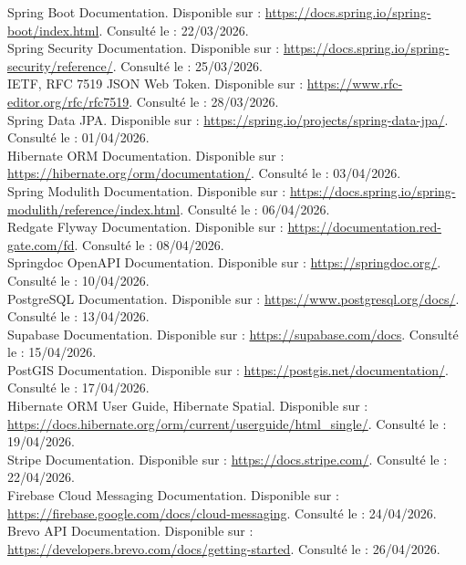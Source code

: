 \noindent [13] Spring Boot Documentation. Disponible sur : \url{https://docs.spring.io/spring-boot/index.html}. Consulté le : 22/03/2026.\\
\noindent [14] Spring Security Documentation. Disponible sur : \url{https://docs.spring.io/spring-security/reference/}. Consulté le : 25/03/2026.\\
\noindent [15] IETF, RFC 7519 JSON Web Token. Disponible sur : \url{https://www.rfc-editor.org/rfc/rfc7519}. Consulté le : 28/03/2026.\\
\noindent [16] Spring Data JPA. Disponible sur : \url{https://spring.io/projects/spring-data-jpa/}. Consulté le : 01/04/2026.\\
\noindent [17] Hibernate ORM Documentation. Disponible sur : \url{https://hibernate.org/orm/documentation/}. Consulté le : 03/04/2026.\\
\noindent [18] Spring Modulith Documentation. Disponible sur : \url{https://docs.spring.io/spring-modulith/reference/index.html}. Consulté le : 06/04/2026.\\
\noindent [19] Redgate Flyway Documentation. Disponible sur : \url{https://documentation.red-gate.com/fd}. Consulté le : 08/04/2026.\\
\noindent [20] Springdoc OpenAPI Documentation. Disponible sur : \url{https://springdoc.org/}. Consulté le : 10/04/2026.\\
\noindent [21] PostgreSQL Documentation. Disponible sur : \url{https://www.postgresql.org/docs/}. Consulté le : 13/04/2026.\\
\noindent [22] Supabase Documentation. Disponible sur : \url{https://supabase.com/docs}. Consulté le : 15/04/2026.\\
\noindent [23] PostGIS Documentation. Disponible sur : \url{https://postgis.net/documentation/}. Consulté le : 17/04/2026.\\
\noindent [24] Hibernate ORM User Guide, Hibernate Spatial. Disponible sur : \url{https://docs.hibernate.org/orm/current/userguide/html_single/}. Consulté le : 19/04/2026.\\
\noindent [25] Stripe Documentation. Disponible sur : \url{https://docs.stripe.com/}. Consulté le : 22/04/2026.\\
\noindent [26] Firebase Cloud Messaging Documentation. Disponible sur : \url{https://firebase.google.com/docs/cloud-messaging}. Consulté le : 24/04/2026.\\
\noindent [27] Brevo API Documentation. Disponible sur : \url{https://developers.brevo.com/docs/getting-started}. Consulté le : 26/04/2026.\\
